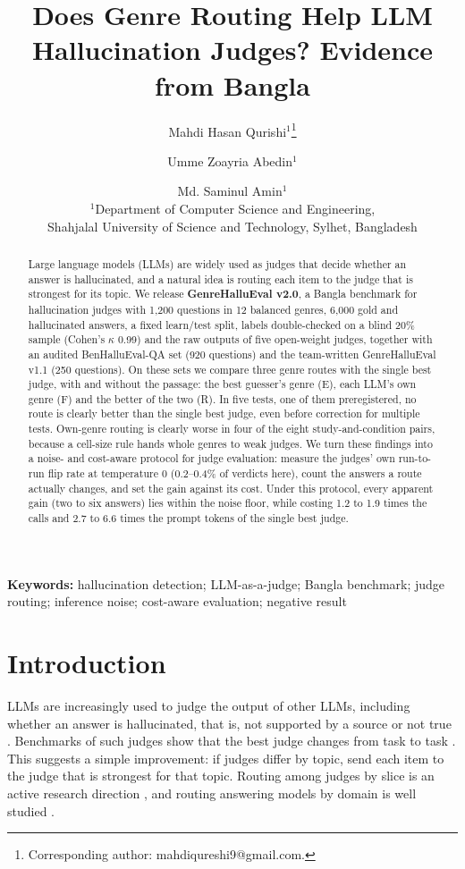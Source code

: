 \documentclass[11pt]{article}
\title{Does Genre Routing Help LLM Hallucination Judges? Evidence from Bangla}
\author{Mahdi Hasan Qurishi$^{1}$\thanks{Corresponding author: mahdiqureshi9@gmail.com.} \and
Umme Zoayria Abedin$^{1}$ \and Md. Saminul Amin$^{1}$\\[4pt]
\small $^{1}$Department of Computer Science and Engineering,\\ \small Shahjalal University of Science and Technology,
Sylhet, Bangladesh}
\date{}
\begin{document}
\maketitle

\begin{abstract}
Large language models (LLMs) are widely used as judges that decide whether an answer is hallucinated, and a natural
idea is routing each item to the judge that is strongest for its topic. We release \textbf{GenreHalluEval v2.0}, a
Bangla benchmark for hallucination judges with 1,200 questions in 12 balanced genres, 6,000 gold and hallucinated
answers, a fixed learn/test split, labels double-checked on a blind 20\% sample (Cohen's $\kappa$ 0.99) and the raw
outputs of five open-weight judges, together with an audited BenHalluEval-QA set (920 questions) and the team-written
GenreHalluEval v1.1 (250 questions). On these sets we compare three genre routes with the single best judge, with and
without the passage: the best guesser's genre (E), each LLM's own genre (F) and the better of the two (R). In five
tests, one of them preregistered, no route is clearly better than the single best judge, even before correction for
multiple tests. Own-genre routing is clearly worse in four of the eight study-and-condition pairs, because a cell-size
rule hands whole genres to weak judges. We turn these findings into a noise- and cost-aware protocol for judge evaluation:
measure the judges' own run-to-run flip rate at temperature 0 (0.2--0.4\% of verdicts here), count the
answers a route actually changes, and set the gain against its cost. Under this protocol, every apparent gain (two to
six answers) lies within the noise floor, while costing 1.2 to 1.9 times the calls and 2.7 to 6.6 times the prompt
tokens of the single best judge.
\end{abstract}

\noindent\textbf{Keywords:} hallucination detection; LLM-as-a-judge; Bangla benchmark; judge routing; inference
noise; cost-aware evaluation; negative result

\section{Introduction}

LLMs are increasingly used to judge the output of other LLMs, including whether an answer is hallucinated, that is,
not supported by a source or not true \citep{zheng2023judging}. Benchmarks of such judges show that the best judge
changes from task to task \citep{benhallueval}. This suggests a simple improvement: if judges differ by topic, send
each item to the judge that is strongest for that topic. Routing among judges by slice is an active research direction
\citep{judgepanels2026,juryondemand2025}, and routing answering models by domain is well studied
\citep{shnitzer2023routing,inferencedynamics2025,archrouter2025}.
\end{document}
